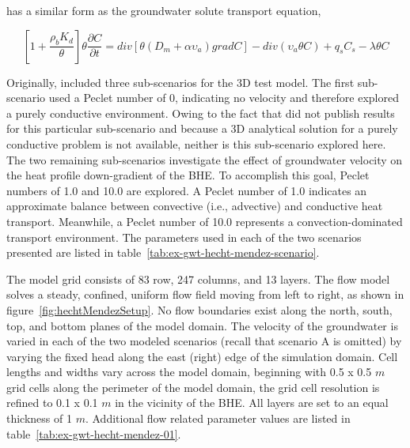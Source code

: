 has a similar form as the groundwater solute transport equation,

\begin{equation*}
\left[ 1 + \frac{\rho_b K_d}{\theta} \right] \theta \frac{\partial  C}{\partial t}
= div \left[ \theta \left( D_m + \alpha \upsilon_a \right) grad C \right] - div \left( \upsilon_a \theta C \right) + q_s C_s - \lambda \theta C
\end{equation*}

Originally, \cite{hechtMendez2010} included three sub-scenarios for the 3D test model.  The first sub-scenario used a Peclet number of 0, indicating no velocity and therefore explored a purely conductive environment.  Owing to the fact that \citep{hechtMendez2010} did not publish results for this particular sub-scenario and because a 3D analytical solution for a purely conductive problem is not available, neither is this sub-scenario explored here.  The two remaining sub-scenarios investigate the effect of groundwater velocity on the heat profile down-gradient of the BHE.  To accomplish this goal, Peclet numbers of 1.0 and 10.0 are explored. A Peclet number of 1.0 indicates an approximate balance between convective (i.e., advective) and conductive heat transport.  Meanwhile, a Peclet number of 10.0 represents a convection-dominated transport environment.  The parameters used in each of the two scenarios presented are listed in table~\ref{tab:ex-gwt-hecht-mendez-scenario}. 



The model grid consists of 83 row, 247 columns, and 13 layers.  The flow model solves a steady, confined, uniform flow field moving from left to right, as shown in figure~\ref{fig:hechtMendezSetup}. No flow boundaries exist along the north, south, top, and bottom planes of the model domain.  The velocity of the groundwater is varied in each of the two modeled scenarios (recall that scenario A is omitted) by varying the fixed head along the east (right) edge of the simulation domain.  Cell lengths and widths vary across the model domain, beginning with 0.5 x 0.5 $m$ grid cells along the perimeter of the model domain, the grid cell resolution is refined to 0.1 x 0.1 $m$ in the vicinity of the BHE.  All layers are set to an equal thickness of 1 $m$.  Additional flow related parameter values are listed in table~\ref{tab:ex-gwt-hecht-mendez-01}.  



